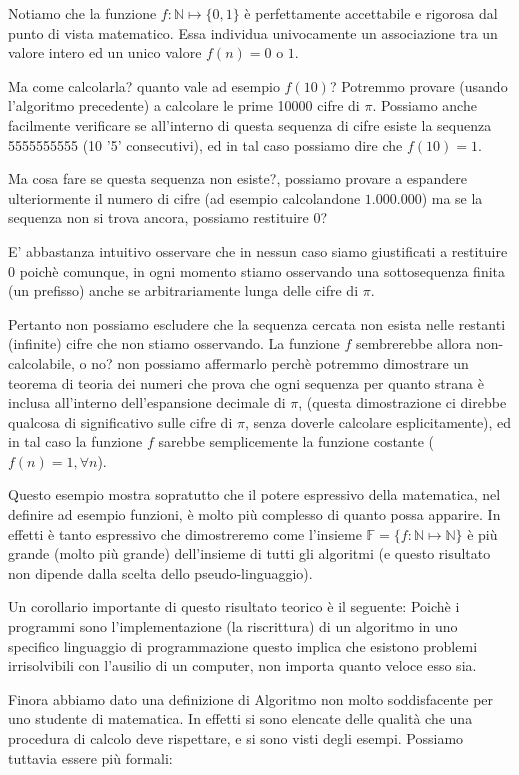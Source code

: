 Notiamo che la funzione $f: \mathbb{N} \mapsto \{0,1\}$ è
perfettamente accettabile e rigorosa dal punto di vista
matematico. Essa individua univocamente un associazione tra un valore
intero ed un unico valore $f(n) = 0$ o $1$.

Ma come calcolarla? quanto vale ad esempio $f(10)$? Potremmo provare
(usando l'algoritmo precedente) a calcolare le prime 10000 cifre di
$\pi$. Possiamo anche facilmente verificare se all'interno di questa
sequenza di cifre esiste la sequenza 5555555555 (10 '5' consecutivi),
ed in tal caso possiamo dire che $f(10) = 1$.

Ma cosa fare se questa sequenza non esiste?, possiamo provare a
espandere ulteriormente il numero di cifre (ad esempio calcolandone
$1.000.000$) ma se la sequenza non si trova ancora, possiamo
restituire $0$?

E' abbastanza intuitivo osservare che in nessun caso siamo
giustificati a restituire 0 poichè comunque, in ogni momento stiamo
osservando una sottosequenza finita (un prefisso) anche se
arbitrariamente lunga delle cifre di $\pi$.

Pertanto non possiamo escludere che la sequenza cercata non esista
nelle restanti (infinite) cifre che non stiamo osservando. La funzione
$f$ sembrerebbe allora non-calcolabile, o no? non possiamo affermarlo
perchè potremmo dimostrare un teorema di teoria dei numeri che
prova che ogni sequenza per quanto strana è inclusa all'interno dell'espansione
decimale di $\pi$, (questa dimostrazione ci direbbe qualcosa di significativo
sulle cifre di $\pi$, senza doverle calcolare esplicitamente), ed in tal caso la
funzione $f$ sarebbe semplicemente la funzione costante ($f(n) = 1,
\forall n$).

Questo esempio mostra sopratutto che il potere espressivo della
matematica, nel definire ad esempio funzioni, è molto più complesso di
quanto possa apparire. In effetti è tanto espressivo che dimostreremo come
l'insieme $\mathbb{F} = \{f: \mathbb{N} \mapsto \mathbb{N}\}$ è più grande (molto più
grande) dell'insieme di tutti gli algoritmi (e questo risultato non
dipende dalla scelta dello pseudo-linguaggio).

Un corollario importante di questo risultato teorico è il seguente:
Poichè i programmi sono l'implementazione (la riscrittura) di un
algoritmo in uno specifico linguaggio di programmazione questo implica
che esistono problemi irrisolvibili con l'ausilio di un computer, non
importa quanto veloce esso sia.

Finora abbiamo dato una definizione di Algoritmo non molto
soddisfacente per uno studente di matematica. In effetti si sono
elencate delle qualità che una procedura di calcolo deve rispettare, e
si sono visti degli esempi. Possiamo tuttavia essere più formali:

